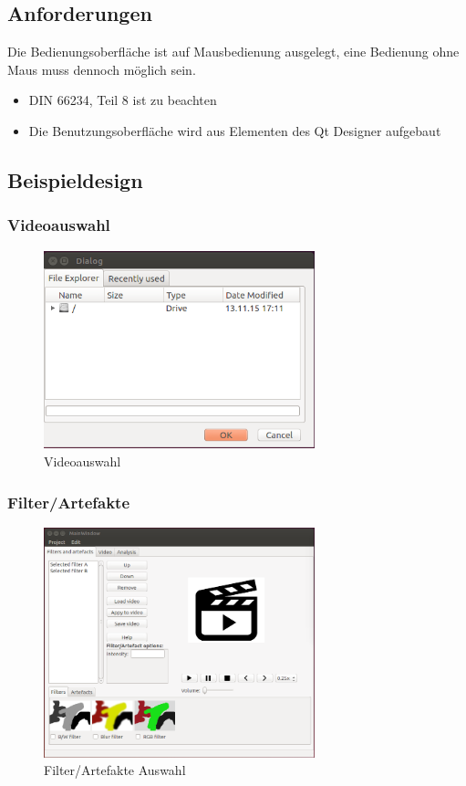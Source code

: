 \documentclass[parskip=full]{scrartcl}
\begin{document}
\subsection{Anforderungen}
Die Bedienungsoberfläche ist auf Mausbedienung ausgelegt, eine Bedienung ohne Maus muss dennoch möglich sein.
\begin{itemize}
\item DIN 66234, Teil 8 ist zu beachten
\item Die Benutzungsoberfläche wird aus Elementen des Qt Designer aufgebaut
\end{itemize}
\subsection{Beispieldesign}

\subsubsection{Videoauswahl}
\begin{figure}[htbp] 
\centering
\includegraphics[width=0.7\textwidth]{ToViET/Screenshots/Explorer.png}
\caption{Videoauswahl}
\end{figure}
\newpage
\subsubsection{Filter/Artefakte}
\begin{figure}[htbp] 
\centering
\includegraphics[width=0.7\textwidth]{ToViET/Screenshots/MainWindow_1.png}
\caption{Filter/Artefakte Auswahl}
\end{figure}
\newpage
\end{document}
